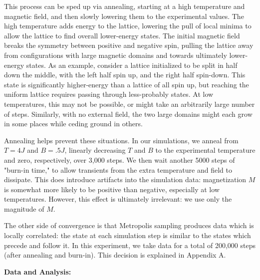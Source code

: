 \documentclass[letter,scriptaddress,twocolumn, prl]{revtex4}
\begin{document}
This process can be sped up via annealing, starting at a high temperature and magnetic field, and then slowly lowering them to the experimental values. The high temperature adds energy to the lattice, lowering the pull of local minima to allow the lattice to find overall lower-energy states. The initial magnetic field breaks the symmetry between positive and negative spin, pulling the lattice away from configurations with large magnetic domains and towards ultimately lower-energy states. As an example, consider a lattice initialized to be split in half down the middle, with the left half spin up, and the right half spin-down. This state is significantly higher-energy than a lattice of all spin up, but reaching the uniform lattice requires passing through less-probably states. At low temperatures, this may not be possible, or might take an arbitrarily large number of steps. Similarly, with no external field, the two large domains might each grow in some places while ceding ground in others. 

Annealing helps prevent these situations. In our simulations, we anneal from $T = 4 J$ and $B = .5 J$, linearly decreasing $T$ and $B$ to the experimental temperature and zero, respectively, over 3,000 steps. We then wait another 5000 steps of "burn-in time," to allow transients from the extra temperature and field to dissipate. This does introduce artifacts into the simulation data: magnetization $M$ is somewhat more likely to be positive than negative, especially at low temperatures. However, this effect is ultimately irrelevant: we use only the magnitude of $M$.

The other side of convergence is that Metropolis sampling produces data which is locally correlated: the state at each simulation step is similar to the states which precede and follow it. In this experiment, we take data for a total of 200,000 steps (after annealing and burn-in). This decision is explained in Appendix A.

\textbf{Data and Analysis:}
\end{document}
